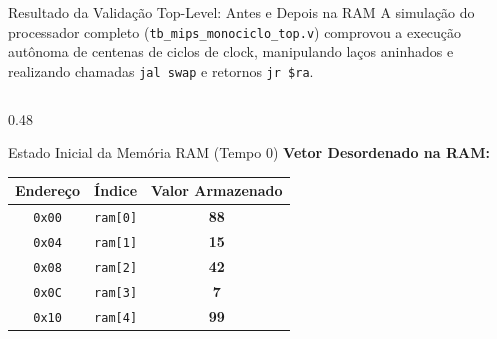 \documentclass[aspectratio=169, 11pt]{beamer}
\begin{document}
\begin{frame}{Resultado da Validação Top-Level: Antes e Depois na RAM}
  A simulação do processador completo (\texttt{tb\_mips\_monociclo\_top.v}) comprovou a execução autônoma de centenas de ciclos de clock, manipulando laços aninhados e realizando chamadas \texttt{jal swap} e retornos \texttt{jr \$ra}.

  \vspace{0.3cm}
  \begin{columns}[T]
    \begin{column}{0.48\textwidth}
      \begin{alertblock}{Estado Inicial da Memória RAM (Tempo 0)}
        \centering
        \textbf{Vetor Desordenado na RAM:} \\
        \vspace{0.2cm}
        \small
        \begin{tabular}{ccc}
          \toprule
          \textbf{Endereço} & \textbf{Índice} & \textbf{Valor Armazenado} \\
          \midrule
          \texttt{0x00} & \texttt{ram[0]} & \textbf{88} \\
          \texttt{0x04} & \texttt{ram[1]} & \textbf{15} \\
          \texttt{0x08} & \texttt{ram[2]} & \textbf{42} \\
          \texttt{0x0C} & \texttt{ram[3]} & \textbf{7} \\
          \texttt{0x10} & \texttt{ram[4]} & \textbf{99} \\
          \bottomrule
        \end{tabular}
      \end{alertblock}
    \end{column}


\end{columns}
\end{frame}
\end{document}
